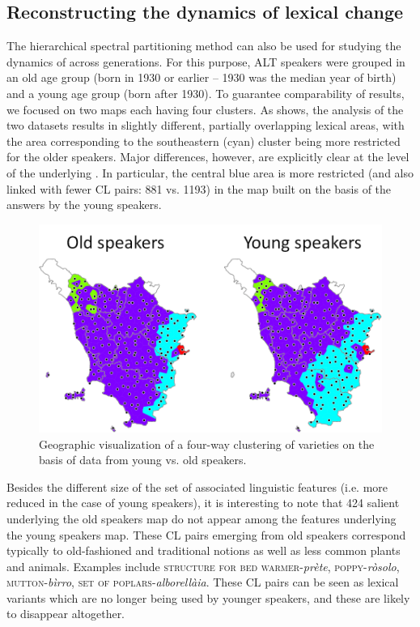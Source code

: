 \documentclass[output=paper]{LSP/langsci}
\begin{document}
\subsection{Reconstructing the dynamics of lexical change}
The hierarchical spectral partitioning method can also be used for studying the dynamics of  across generations. For this purpose, ALT speakers were grouped in an old age group (born in 1930 or earlier – 1930 was the median year of birth) and a young age group (born after 1930). To guarantee comparability of results, we focused on two maps each having four clusters. As  shows, the analysis of the two datasets results in slightly different, partially overlapping lexical areas, with the area corresponding to the southeastern (cyan) cluster being more restricted for the older speakers. Major differences, however, are explicitly clear at the level of the underlying . In particular, the central blue area is more restricted (and also linked with fewer CL pairs: 881 vs. 1193) in the map built on the basis of the answers by the young speakers. 


\begin{figure}[t]
\includegraphics[width=.7\textwidth]{illustrations/monte_wiel_fig4} 
\caption{Geographic visualization of a four-way clustering of  varieties on the basis of data from young vs. old speakers.}
\label{fig:monte:4}
\end{figure}

Besides the different size of the set of associated linguistic features (i.e. more reduced in the case of young speakers), it is interesting to note that 424 salient  underlying the old speakers map do not appear among the features underlying the young speakers map. These CL pairs emerging from old speakers correspond typically to old-fashioned and traditional notions as well as less common plants and animals. Examples include \textsc{structure for bed warmer}{}-\textit{prète}, \textsc{poppy}{}-\textit{ròsolo}, \textsc{mutton}{}-\textit{bìrro}, \textsc{set of poplars}{}-\textit{alborellàia}. These CL pairs can be seen as lexical variants which are no longer being used by younger speakers, and these are likely to disappear altogether. 
\end{document}
